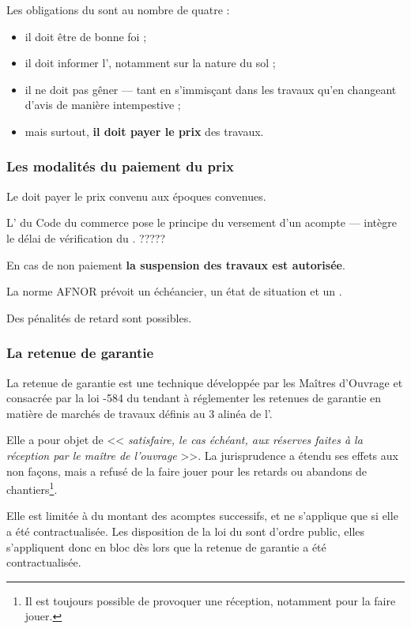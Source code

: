			Les obligations du \Mo sont au nombre de quatre :
			\begin{itemize}
				\item il doit être de bonne foi ;
				\item il doit informer l'\E, notamment sur la nature du sol ;
				\item il ne doit pas gêner --- tant en s'immisçant dans les travaux qu'en changeant d'avis de manière intempestive ;
				\item mais surtout, \textbf{il doit payer le prix} des travaux.
			\end{itemize}
		
			\subsubsection{Les modalités du paiement du prix}
			
				Le \Mo doit payer le prix convenu aux époques convenues.
				
				L' du Code du commerce pose le principe du versement d'un acompte --- intègre le délai de vérification du \Moe. ?????
				
				En cas de non paiement \textbf{la suspension des travaux est autorisée}.
				
				La norme AFNOR prévoit un échéancier, un état de situation et un \dgd.
				
				Des pénalités de retard sont possibles.
			
			\subsubsection{La retenue de garantie}
			
				La retenue de garantie est une technique développée par les Maîtres d'Ouvrage et consacrée par la loi -584 du  tendant à réglementer les retenues de garantie en matière de marchés de travaux définis au 3\ieme{} alinéa de l'.
				
				Elle a pour objet de << \textit{satisfaire, le cas échéant, aux réserves faites à la réception par le maître de l'ouvrage} >>. La jurisprudence a étendu ses effets aux non façons, mais a refusé de la faire jouer pour les retards ou abandons de chantiers\footnote{Il est toujours possible de provoquer une réception, notamment pour la faire jouer.}.
				
				Elle est limitée à  du montant des acomptes successifs, et ne s'applique que si elle a été contractualisée. Les disposition de la loi du  sont d'ordre public, elles s'appliquent donc en bloc dès lors que la retenue de garantie a été contractualisée.
				
